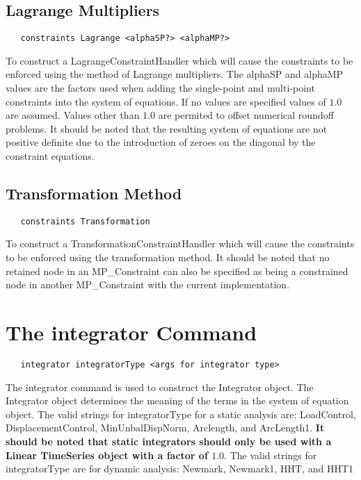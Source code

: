 \documentclass[12pt]{article}
\begin{document}
\subsection{Lagrange Multipliers}

{\sf\small
\begin{verbatim}
   constraints Lagrange <alphaSP?> <alphaMP?>
\end{verbatim}
}

\noindent To construct a LagrangeConstraintHandler which will cause the
constraints to be enforced using the method of Lagrange multipliers. The alphaSP and
alphaMP values are the factors used when adding the single-point and
multi-point constraints into the system of equations. If no values are specified
values of $1.0$ are assumed. Values other than $1.0$ are permited to offset numerical
roundoff problems. It should be
noted that the resulting system of equations are not positive definite
due to the introduction of zeroes on the diagonal by the constraint equations.

\subsection{Transformation Method}

{\sf\small
\begin{verbatim}
   constraints Transformation 
\end{verbatim}
}

\noindent To construct a TransformationConstraintHandler which will cause the
constraints to be enforced using the transformation method. It should be noted
that no retained node in an MP\_Constraint can also be specified as being a
constrained node in another MP\_Constraint with the current implementation.

\section {The integrator Command}
{\sf\small
\begin{verbatim}
   integrator integratorType <args for integrator type>
\end{verbatim}
}

The integrator command is used to construct the Integrator
object. The Integrator object determines the meaning of the terms in
the system of equation object. The valid strings for
integratorType for a static analysis are: LoadControl,
DisplacementControl, MinUnbalDispNorm, Arclength, and ArcLength1.
{\bf It should be noted that static
integrators should only be used with a Linear TimeSeries object with a
factor of $1.0$}. The valid strings for integratorType are for dynamic
analysis: Newmark, Newmark1, HHT, and HHT1
\end{document}
